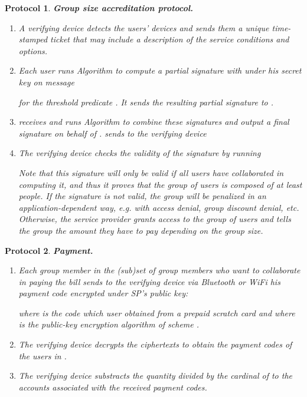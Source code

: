 \documentclass[11pt]{llncs}
\newtheorem{proto}{Protocol}
\begin{document}
\begin{proto}
\textbf{Group size accreditation protocol.}\label{ab.proto.accr}
\begin{enumerate}
\item A verifying device detects the users' devices and sends them
a unique time-stamped ticket  that may include
a description of the service conditions and options.
\item Each user  runs Algorithm   to compute a
partial signature with  under his secret key  on
message

for the threshold predicate .
It sends the resulting partial signature  to .
\item  receives  and runs
Algorithm  
to combine these signatures and output a final signature  on behalf of .
 sends to the verifying device

\item The verifying device checks the validity of the signature by running

Note that this signature will only be valid if all users  have collaborated in
computing it, and thus it proves that the group of users is composed of at least  people.
If the signature is not valid, the group will be penalized in
an application-dependent way, {\em e.g.} with access denial,
group discount denial, etc.
Otherwise, the service provider grants access to the
group of users and tells the group the amount 
they have to pay
depending on the group size.
\end{enumerate}
\end{proto}

\begin{proto}
\textbf{Payment.}
\begin{enumerate}
\item Each group member  in the (sub)set  of group members
who want to collaborate
in paying the bill sends to the verifying device via Bluetooth or WiFi his payment code encrypted
under SP's public key:

where  is the code which user  obtained from a prepaid scratch card
and where  is the public-key encryption algorithm
of scheme .
\item The verifying device decrypts the
ciphertexts  to obtain the payment
codes of the users in .
\item The verifying device substracts the quantity  divided by the cardinal
of  to the accounts associated with the received payment codes.
\end{enumerate}
\end{proto}
\end{document}
